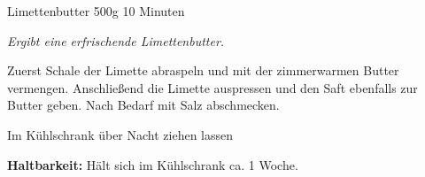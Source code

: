 \begin{recipe}{Limettenbutter} {500g} {10 Minuten}

\freeform
\textit{Ergibt eine erfrischende Limettenbutter.}


Zuerst Schale der Limette abraspeln und mit der zimmerwarmen Butter vermengen.
Anschließend die Limette auspressen und den Saft ebenfalls zur Butter geben.
Nach Bedarf mit Salz abschmecken.

\newstep
Im Kühlschrank über Nacht ziehen lassen

\freeform
\hrulefill

\freeform 
\textbf{Haltbarkeit:}
Hält sich im Kühlschrank ca. 1 Woche.

\end{recipe}
